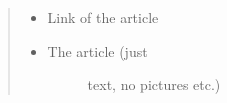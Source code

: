 \documentclass[letterpaper,10pt,english]{sphinxmanual}
\begin{document}
\begin{fulllineitems}
\begin{fulllineitems}
\begin{quote}
\begin{itemize}
\item {} 
Link of the article

\item {} \begin{description}
\item[{The article (just}] \leavevmode
text, no pictures etc.)

\end{description}

\end{itemize}
\end{quote}

\end{fulllineitems}


\end{fulllineitems}

\end{document}
